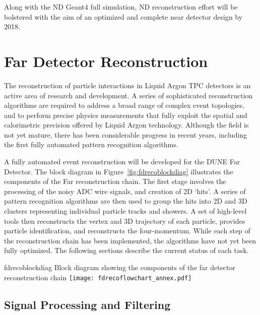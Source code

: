 Along with the ND Geant4 full simulation, ND reconstruction effort will be bolstered 
with the aim of an optimized and complete near detector design by 2018.

\section{Far Detector Reconstruction}
\label{annex:detectors-sc-physics-software-reconstruction-fd}

The reconstruction of particle interactions in Liquid Argon TPC
detectors is an active area of research and development.
A series of sophisticated reconstruction algorithms are required to
address a broad range of complex event topologies, and to perform
precise physics measurements that fully exploit the spatial and 
calorimetric precision offered by Liquid Argon technology.
Although the field is not yet mature, there has been considerable
progress in recent years, including the first fully automated
pattern recognition algorithms. 

A fully automated event reconstruction will be developed for the
DUNE Far Detector. The block diagram in Figure~\ref{fig:fdrecoblockdiag}
illustrates the components of the Far reconstruction chain. 
The first stage involves the processing of the noisy ADC wire signals,
and creation of 2D `hits'. A series of pattern recognition algorithms
are then used to group the hits into 2D and 3D clusters representing 
individual particle tracks and showers. A set of high-level tools
then reconstructs the vertex and 3D trajectory of each particle,
provides particle identification, and reconstructs the four-momentum.
While each step of the reconstruction chain has been implemented,
the algorithms have not yet been fully optimized.
The following sections describe the current status of each task.

\begin{cdrfigure}{fdrecoblockdiag}
{Block diagram showing the components of the far detector reconstruction chain}
\texttt{[image: fdrecoflowchart\_annex.pdf]}
\end{cdrfigure}

\subsection{Signal Processing and Filtering}
\label{annex:reconstruction-signal-proc}

